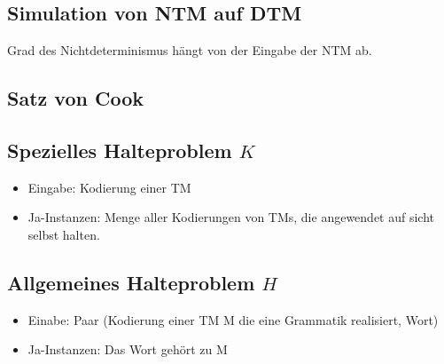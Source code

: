 \documentclass[ngerman]{scrartcl}
\begin{document}
\subsection{Simulation von NTM auf DTM}
Grad des Nichtdeterminismus hängt von der Eingabe der NTM ab.


\subsection{Satz von Cook}

\subsection{Spezielles Halteproblem $ K $}
\begin{itemize}
    \item Eingabe: Kodierung einer TM
    \item Ja-Instanzen: Menge aller Kodierungen von TMs, die angewendet auf sicht selbst halten.
\end{itemize}

\subsection{Allgemeines Halteproblem $ H $}
\begin{itemize}
    \item Einabe: Paar (Kodierung einer TM M die eine Grammatik realisiert, Wort)
    \item Ja-Instanzen: Das Wort gehört zu M
\end{itemize}
\end{document}
